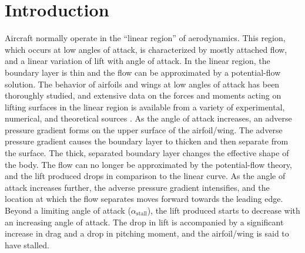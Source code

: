

\section{Introduction}

Aircraft normally operate in the ``linear region'' of aerodynamics.
This region, which occurs at low angles of attack, is characterized by mostly attached flow, and a linear variation of lift with angle of attack.
In the linear region, the boundary layer is thin and the flow can be approximated by a potential-flow solution.
The behavior of airfoils and wings at low angles of attack has been thoroughly studied, and extensive data on the forces and moments acting on lifting surfaces in the linear region is available from a variety of experimental, numerical, and theoretical sources \cite{abbott,stuttgarter_profilkatalog_1,lsats_3,xfoil,drela_avl}.%
As the angle of attack increases, an adverse pressure gradient forms on the upper surface of the airfoil/wing. The adverse pressure gradient %
causes the boundary layer to thicken and then separate from the surface.
The thick, separated boundary layer changes the effective shape of the body. The flow can no longer be approximated by the potential-flow theory, and
the lift produced drops in comparison to the linear curve.
As the angle of attack increases further, the adverse pressure gradient intensifies, and the location at which the flow separates moves forward towards the leading edge.
Beyond a limiting angle of attack ($\alpha_\text{stall}$), the lift produced starts to decrease with an increasing angle of attack. The drop in lift is accompanied by a significant increase in drag and a drop in pitching moment, and the airfoil/wing is said to have stalled.

